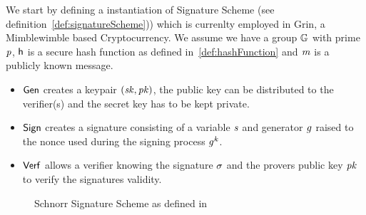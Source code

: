 We start by defining a instantiation of Signature Scheme (see definition~\ref{def:signatureScheme})) which is currenlty employed in Grin, a Mimblewimble based Cryptocurrency.
We assume we have a group $\mathbb{G}$ with prime $\mathit{p}$, $\mathsf{h}$ is a secure hash function as defined in~\ref{def:hashFunction} and $\mathit{m}$ is a publicly known message.\\
\begin{itemize}
    \item $\mathsf{\mathsf{Gen}}$ creates a keypair $(\mathit{sk}, \mathit{pk})$, the public key can be distributed to the verifier(s) and the secret key has to be kept private. \\
    \item $\mathsf{Sign}$ creates a signature consisting of a variable $\mathit{s}$ and generator $\mathit{g}$ raised to the nonce used during the signing process $\mathit{g}^{\mathit{k}}$. \\
    \item $\mathsf{Verf}$ allows a verifier knowing the signature $\sigma$ and the provers public key $\mathit{pk}$ to verify the signatures validity. \\
\end{itemize}
\begin{figure}
    \label{fig:schnorr}
    \fbox{
        \parbox{\textwidth}{
            \procedure[linenumbering, syntaxhighlight=auto]{$\procGen{\varSecParam}$} {
                \varKey \sample \cnstIntegersPrimeWithoutZero{\varPrime} \\
                \pcreturn (\varSecKey \opAssign \varKey \opSeperate \varPubKey \opAssign \funGen{\varKey})
            }
            \procedure[linenumbering, syntaxhighlight=auto]{$\procSign{\varMsg}{\varSecKey}$}{
                \varNonce \sample \cnstIntegersPrimeWithoutZero{\varPrime} \\
                \varRand \opAssign \funGen{\varNonce} \\
                \varSchnorrChallenge \opAssign \funHash{\varMsg \opConc \varRand \opConc \varPubKey} \\
                \varS \opAssign \varNonce \opAddScalar \varSchnorrChallenge \opTimesScalar \varSecKey \\
                \pcreturn \varSignature \opAssign (\varS, \varRand)
            }
            \procedure[linenumbering, syntaxhighlight=auto]{$\procVerf{\varMsg}{\varSignature}{\varPubKey}$} {
                \varS \opAssign \opAccess{\varSignature}{\varS} \\
                \varRand \opAssign \opAccess{\varSignature}{\varRand} \\
                \varSchnorrChallenge \opAssign \funHash{\varMsg \opConc \varRand \opConc \varPubKey} \\
                \pcreturn \funGen{\varS} \opEq \opPointScalar{\varRand}{\varSchnorrChallenge} \opAddPoint \varPubKey
            }
        }
    }
    \caption{Schnorr Signature Scheme as defined in~\cite{schnorr1989efficient}}
\end{figure}
